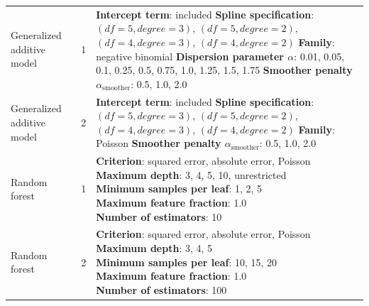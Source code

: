 \begin{longtable}{p{} p{} p{}}
\midrule

Generalized additive model 
& 1 
& \makecell[l]{
\textbf{Intercept term}: included \\
\textbf{Spline specification}: \((df=5, degree=3)\), \((df=5, degree=2)\), \\
\hspace{1em} \((df=4, degree=3)\), \((df=4, degree=2)\) \\
\textbf{Family}: negative binomial \\
\textbf{Dispersion parameter \(\alpha\)}: 0.01, 0.05, 0.1, 0.25, 0.5, \\
\hspace{1em} 0.75, 1.0, 1.25, 1.5, 1.75 \\
\textbf{Smoother penalty \(\alpha_{\text{smoother}}\)}: 0.5, 1.0, 2.0
} \\

\hdashline

Generalized additive model 
& 2 
& \makecell[l]{
\textbf{Intercept term}: included \\
\textbf{Spline specification}: \((df=5, degree=3)\), \((df=5, degree=2)\), \\
\hspace{1em} \((df=4, degree=3)\), \((df=4, degree=2)\) \\
\textbf{Family}: Poisson \\
\textbf{Smoother penalty \(\alpha_{\text{smoother}}\)}: 0.5, 1.0, 2.0
} \\

\midrule

Random forest 
& 1 
& \makecell[l]{
\textbf{Criterion}: squared error, absolute error, Poisson \\
\textbf{Maximum depth}: 3, 4, 5, 10, unrestricted \\
\textbf{Minimum samples per leaf}: 1, 2, 5 \\
\textbf{Maximum feature fraction}: 1.0 \\
\textbf{Number of estimators}: 10
} \\

\hdashline

Random forest 
& 2 
& \makecell[l]{
\textbf{Criterion}: squared error, absolute error, Poisson \\
\textbf{Maximum depth}: 3, 4, 5 \\
\textbf{Minimum samples per leaf}: 10, 15, 20 \\
\textbf{Maximum feature fraction}: 1.0 \\
\textbf{Number of estimators}: 100
} \\


\end{longtable}
